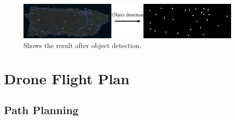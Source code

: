 \documentclass{article} %
\begin{document}
    \begin{figure}[h]
        \centering
            \includegraphics[scale=0.6]{object_detection.png}
        \caption{Shows the result after object detection.}
    \end{figure}

\section[]{Drone Flight Plan}
\subsection{Path Planning}
\end{document}

